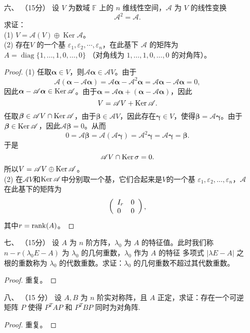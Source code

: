\begin{enumerate}[1~]
\item[六、]（15分）
设 $V$ 为数域 $\mathbb{F}$ 上的 $n$ 维线性空间，$\mathscr{A}$ 为 $V$ 的线性变换\[
\mathscr { A } ^ { 2 } = \mathscr { A }.
\]
求证：\\
(1) $V = \mathscr { A } ( V ) \oplus \operatorname { Ker } \mathscr { A }$。\\
(2) 存在$V$ 的一个基 $\varepsilon _ { 1 } , \varepsilon _ { 2 } , \cdots , \varepsilon _ { n }$，在此基下 $\mathscr{A}$ 的矩阵为 $A = \operatorname { diag } \{ 1 , \dotsc , 1,0 , \dotsc , 0 \}$ （对角线为
$1 , \dotsc , 1 , 0 , \dotsc , 0$ 的对角阵）。
\begin{proof}
(1) 任取$\boldsymbol{\alpha} \in V$，则$\mathscr { A } { \boldsymbol{\alpha} } \in \mathscr{A}V$。由于\[
\mathscr { A } ( \boldsymbol{\alpha} - \mathscr { A } \boldsymbol{\alpha} ) = \mathscr { A } \boldsymbol{\alpha} - \mathscr { A } ^ { 2 } \boldsymbol{\alpha} = \mathscr { A } \boldsymbol{\alpha} - \mathscr { A } \boldsymbol{\alpha} = 0,
\]
因此$\boldsymbol{\alpha} - \mathscr { A } { \boldsymbol{\alpha} } \in \operatorname{Ker} \mathscr { A } $。由于$\boldsymbol{\alpha} = \mathscr { A }  { \boldsymbol{\alpha} } + \left( \boldsymbol{\alpha} - \mathscr { A } { \boldsymbol{\alpha} } \right)$，因此\[
V =  \mathscr { A }V + \operatorname{Ker} \mathscr { A }.
\]
任取$\boldsymbol{\beta} \in \mathscr { A }V \cap \operatorname{Ker} \mathscr { A }$，由于$\boldsymbol{\beta} \in\mathscr { A }V$，因此存在$\boldsymbol{\gamma} \in V$，使得$\boldsymbol{\beta} = \mathscr { A } \boldsymbol{\gamma}$。由于$\boldsymbol{\beta} \in \operatorname{Ker} \mathscr { A }$，因此$\mathscr { A } \boldsymbol{\beta} = 0$。从而\[
0 = \mathscr { A } \boldsymbol{\beta} = \mathscr { A } ( \mathscr { A } \boldsymbol{\gamma} ) = \mathscr { A } ^ { 2 } \boldsymbol{\gamma} = \mathscr { A } \boldsymbol{\gamma} = \boldsymbol{\beta}.
\]
于是\[
\mathscr { A }V \cap \operatorname{Ker} \sigma = 0.
\]
所以$V=\mathscr { A }V \oplus \operatorname{Ker} \mathscr { A }$。\\
(2) 在$\mathscr { A }V$和$\operatorname{Ker} \mathscr { A }$中分别取一个基，它们合起来是$V$的一个基 $\varepsilon _ { 1 } , \varepsilon _ { 2 } , \dotsc , \varepsilon _ { n }$，$\mathscr { A }$在此基下的矩阵为\[
\left( \begin{array} { l l } { I _ { r } } & { 0 } \\ { 0 } & { 0 } \end{array} \right),
\]
其中$r={\rm rank}(A)$。
\end{proof}

\item[七、]（15分）
设 $A$ 为 $n$ 阶方阵，$\lambda_0$ 为 $A$ 的特征值。此时我们称 $n -  { r } \left( \lambda _ { 0 } E - A \right)$ 为 $\lambda_0$ 的几何重数，$\lambda_0$ 作为 $A$ 的特征
多项式 $| \lambda E - A |$ 之根的重数称为 $\lambda_0$ 的代数重数。求证：$\lambda_0$ 的几何重数不超过其代数重数。
\begin{proof}
重复。
\end{proof}

\item[八、]（15 分）
设 $A, B$ 为 $n$ 阶实对称阵，且 $A$ 正定，求证：存在一个可逆矩阵 $P$ 使得 $P^T AP$ 和 $P^T BP$ 同时为对角阵.
\begin{proof}
重复。
\end{proof}
\end{enumerate}
\endinput